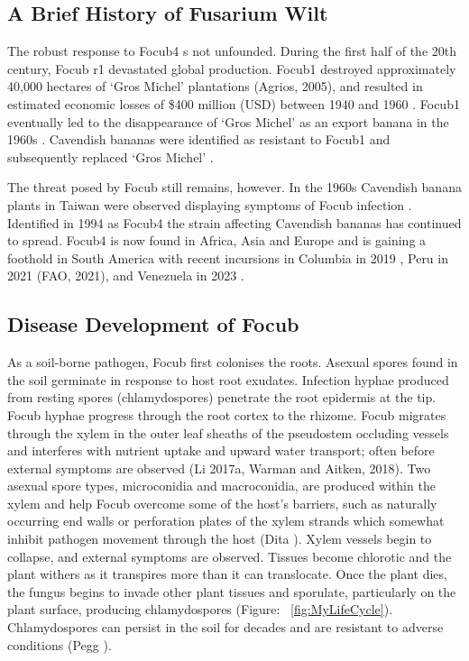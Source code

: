 \subsection{A Brief History of Fusarium Wilt}

The robust response to \ac{Focub4} s not unfounded. During the first half of the 20th century, \acs{Focub} \ac{r1} devastated global production. \acs{Focub1} destroyed approximately 40,000 hectares of ‘Gros Michel’ plantations (Agrios, 2005), and resulted in estimated economic losses of \$400 million (USD) between 1940 and 1960 \parencite{Ploetz2005}. \ac{Focub1} eventually led to the disappearance of ‘Gros Michel’ as an export banana in the 1960s \parencite{Molina2007}. Cavendish bananas were identified as resistant to \ac{Focub1} and subsequently replaced ‘Gros Michel’ \parencite{Ordonez2015}. 

The threat posed by \ac{Focub} still remains, however. In the 1960s Cavendish banana plants in Taiwan were observed displaying symptoms of \ac{Focub} infection \parencite{Agrios2005}. Identified in 1994 as \acl{Focub4} \parencite{Ploetz1994} the strain affecting Cavendish bananas has continued to spread. \Ac{Focub4} is now found in Africa, Asia and Europe \parencite{Ploetz2015a, Thangavelu2019} and is gaining a foothold in South America with recent incursions in Columbia in 2019 \parencite{Garcia-Bastidas2019}, Peru in 2021 (\ac{FAO}, 2021), and Venezuela in 2023 \parencite{Herrera2023}.

\subsection{Disease Development of \acl{Focub}}

As a soil-borne pathogen, \ac{Focub} first colonises the roots. Asexual spores found in the soil germinate in response to host root exudates. Infection hyphae produced from resting spores (chlamydospores) penetrate the root epidermis at the tip. \ac{Focub} hyphae progress through the root cortex to the rhizome. \ac{Focub} migrates through the xylem in the outer leaf sheaths of the pseudostem occluding vessels and interferes with nutrient uptake and upward water transport; often before external symptoms are observed (Li \et 2017a, Warman and Aitken, 2018). Two asexual spore types, microconidia and macroconidia, are produced within the xylem and help \ac{Focub} overcome some of the host’s barriers, such as naturally occurring end walls or perforation plates of the xylem strands which somewhat inhibit pathogen movement through the host (Dita ). Xylem vessels begin to collapse, and external symptoms are observed. Tissues become chlorotic and the plant withers as it transpires more than it can translocate. Once the plant dies, the fungus begins to invade other plant tissues and sporulate, particularly on the plant surface, producing chlamydospores (Figure: ~\ref{fig:MyLifeCycle}). Chlamydospores can persist in the soil for decades and are resistant to adverse conditions (Pegg ).  

